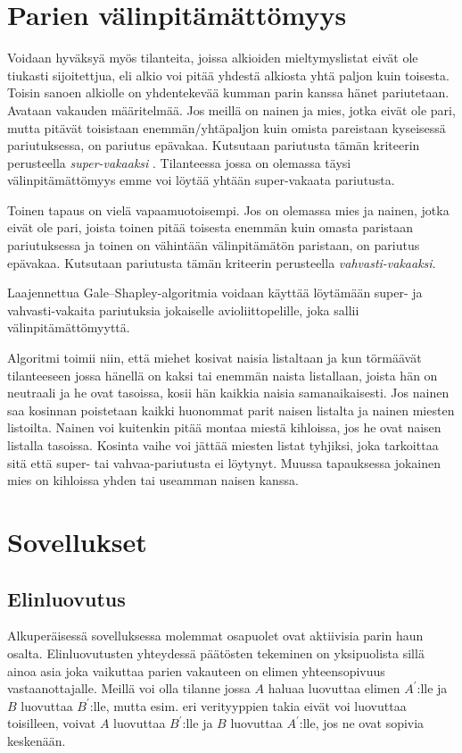 \documentclass[finnish]{tktltiki2}
\theoremstyle{definition}
\theoremstyle{remark}
\begin{document}
\section{Parien välinpitämättömyys}
Voidaan hyväksyä myös tilanteita, joissa alkioiden mieltymyslistat eivät ole tiukasti sijoitettjua, eli alkio voi pitää yhdestä alkiosta yhtä paljon kuin toisesta. Toisin sanoen alkiolle on yhdentekevää kumman parin kanssa hänet pariutetaan. Avataan vakauden määritelmää. Jos meillä on nainen ja mies, jotka eivät ole pari, mutta pitävät toisistaan enemmän/yhtäpaljon kuin omista pareistaan kyseisessä pariutuksessa, on pariutus epävakaa. Kutsutaan pariutusta tämän kriteerin perusteella \emph{super-vakaaksi} \cite{gusfield1989stable}. Tilanteessa jossa on olemassa täysi välinpitämättömyys emme voi löytää yhtään super-vakaata pariutusta.

Toinen tapaus on vielä vapaamuotoisempi. Jos on olemassa mies ja nainen, jotka eivät ole pari, joista toinen pitää toisesta enemmän kuin omasta paristaan pariutuksessa ja toinen on vähintään välinpitämätön paristaan, on pariutus epävakaa. Kutsutaan pariutusta tämän kriteerin perusteella \emph{vahvasti-vakaaksi}.

Laajennettua Gale--Shapley-algoritmia voidaan käyttää löytämään super- ja vahvasti-vakaita pariutuksia jokaiselle avioliittopelille, joka sallii välinpitämättömyyttä.

Algoritmi toimii niin, että miehet kosivat naisia listaltaan ja kun törmäävät tilanteeseen jossa hänellä on kaksi tai enemmän naista listallaan, joista hän on neutraali ja he ovat tasoissa, kosii hän kaikkia naisia samanaikaisesti. Jos nainen saa kosinnan poistetaan kaikki huonommat parit naisen listalta ja nainen miesten listoilta. Nainen voi kuitenkin pitää montaa miestä kihloissa, jos he ovat naisen listalla tasoissa. Kosinta vaihe voi jättää miesten listat tyhjiksi, joka tarkoittaa sitä että super- tai vahvaa-pariutusta ei löytynyt. Muussa tapauksessa jokainen mies on kihloissa yhden tai useamman naisen kanssa.

\section{Sovellukset}
\subsection{Elinluovutus}
Alkuperäisessä sovelluksessa molemmat osapuolet ovat aktiivisia parin haun osalta. Elinluovutusten yhteydessä päätösten tekeminen on yksipuolista sillä ainoa asia joka vaikuttaa parien vakauteen on elimen yhteensopivuus vastaanottajalle. Meillä voi olla tilanne jossa $A$ haluaa luovuttaa elimen $A^{'}$:lle ja $B$ luovuttaa $B^{'}$:lle, mutta esim. eri verityyppien takia eivät voi luovuttaa toisilleen, voivat $A$ luovuttaa $B^{'}$:lle ja $B$ luovuttaa $A^{'}$:lle, jos ne ovat sopivia keskenään.
\end{document}
